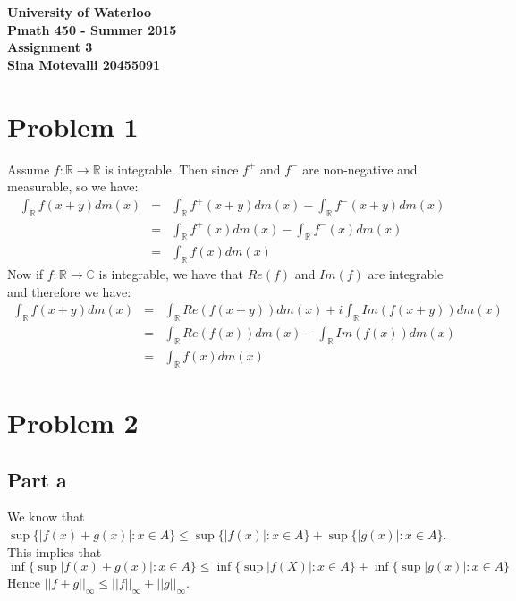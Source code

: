 \documentclass[12pt]{article}
\begin{document}
\begin{center}
  {\Large\bf University of Waterloo}\\
  \vspace{3mm}
         {\Large\bf Pmath 450 - Summer 2015}\\
         \vspace{2mm}
                {\Large\bf Assignment 3}\\
                \vspace{3mm}
                \textbf{Sina Motevalli 20455091}
\end{center}
\section*{Problem 1}
Assume $f:\mathbb{R} \rightarrow \mathbb{R}$ is integrable. Then since $f^+$ and $f^-$ are non-negative and measurable, so we have:
\begin{eqnarray*}
\int_{\mathbb{R}} f(x+y)dm(x) &=&
\int_{\mathbb{R}} f^+(x+y)dm(x) - 
\int_{\mathbb{R}} f^-(x+y)dm(x)
\\ &=&
\int_{\mathbb{R}} f^+(x)dm(x) - 
\int_{\mathbb{R}} f^-(x)dm(x)
\\ &=&
\int_{\mathbb{R}} f(x)dm(x)
\end{eqnarray*}
Now if $f: \mathbb{R} \rightarrow \mathbb{C}$
is integrable, we have that $Re(f)$ and $Im(f)$ are integrable and therefore we have:
\begin{eqnarray*}
\int_{\mathbb{R}} f(x+y)dm(x) &=&
\int_{\mathbb{R}} Re(f(x+y))dm(x) +i 
\int_{\mathbb{R}} Im(f(x+y))dm(x)
\\ &=&
\int_{\mathbb{R}} Re(f(x))dm(x) - 
\int_{\mathbb{R}} Im(f(x))dm(x)
\\ &=&
\int_{\mathbb{R}} f(x)dm(x)
\end{eqnarray*}

\clearpage
\section*{Problem 2}
\subsection*{Part a}
We know that
$\sup \{|f(x)+g(x)|: x \in A\} \le 
\sup \{|f(x)|: x \in A\}+\sup \{|g(x)|: x \in A\}$. This implies that
$$\inf \{\sup |f(x)+g(x)|: x \in A\} 
\le 
\inf \{\sup |f(X)|:x \in A\} +
\inf \{\sup |g(x)|: x \in A\}$$
Hence $||f+g||_{\infty} \le ||f||_{\infty}+||g||_{\infty}$.
\end{document}
